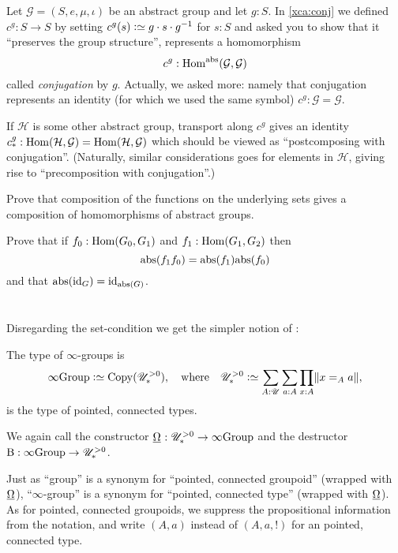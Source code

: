 \begin{example}
  \label{ex:conjhomo}
  Let $\mathcal G=(S,e,\mu,\iota)$ be an abstract group and let $g:S$.  In \cref{xca:conj} we defined $c^g:S\to S$ by setting $c^g(s)\defequi g\cdot s\cdot g^{-1}$ for $s:S$ and asked you to show that it ``preserves the group structure'', \ie represents a homomorphism
$$c^g:\Hom^\abstr(\mathcal G,\mathcal G)$$
called \emph{conjugation} by $g$.  
Actually, we asked more: namely that conjugation represents an identity (for which we used the same symbol) $c^g:\mathcal G=\mathcal G$.

If $\mathcal H$ is some other abstract group, transport along $c^g$ gives an identity
 $c^g_*:\Hom(\mathcal H,\mathcal G)=\Hom(\mathcal H,\mathcal G)$ which should be viewed as ``postcomposing with conjugation''.  (Naturally, similar considerations goes for elements in $\mathcal H$, giving rise to ``precomposition with conjugation''.)
\end{example}

\begin{xca}
Prove that composition of the functions on the underlying sets gives a composition of homomorphisms of abstract groups.

  Prove that if $f_0:\Hom(G_0,G_1)$ and $f_1:\Hom(G_1,G_2)$ then 
$$\mathrm{abs}(f_1f_0)=\mathrm{abs}(f_1)\mathrm{abs}(f_0)$$ and that $\mathrm{abs}(\mathord{\mathrm{id}}_G)=\mathord{\mathrm{id}}_{\mathrm{abs}(G)}$.
\end{xca}



\section{\texorpdfstring{\inftygps}{∞-groups}}
\label{sec:inftygps}

Disregarding the set-condition we get the simpler notion of \inftygps:
\begin{definition}\label{def:inftygps}
  The type of $\infty$-groups is
  \[
    \typeinftygp\defequi \Copy(\UUpconn),
    \quad\text{where}\quad
    \UUpconn\defeq \sum_{A:\UU}\sum_{a:A}\prod_{x:A}\Trunc{x=_Aa},
  \]
  is the type of pointed, connected types.

  We again call the constructor $\mkgroup : \UUpconn \to \typeinftygp$
  and the destructor $\mathrm{B} : {\infty}\mathrm{Group} \to {\mathscr{U}}_\ast^{>0}$.
\end{definition}

\begin{remark}\label{rem:pointedtypes}
  Just as ``group'' is a synonym for ``pointed, connected groupoid''
  (wrapped with $\mkgroup$),
  ``$\infty$-group'' is a synonym for ``pointed, connected type''
  (wrapped with $\mkgroup$).
  As for pointed, connected groupoids,
  we suppress the propositional information from the notation,
  and write $(A,a)$ instead of $(A,a,!)$ for an pointed, connected type.
\end{remark}

